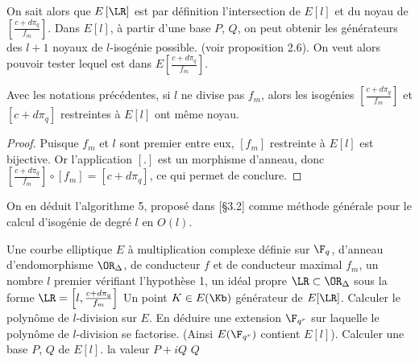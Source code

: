 On sait alors que $E\left[ \LR\right]$ est par définition l'intersection de $E\left[ l\right] $ et du noyau de $\left[  \frac{c + d\pi_{q}}{f_{m}}\right]$. Dans $E[l]$, à partir d'une base $P$, $Q$, on peut obtenir les générateurs des $l+1$ noyaux de $l$-isogénie possible. (voir proposition 2.6). On veut alors pouvoir tester lequel est dans $E\left[  \frac{c + d\pi_{q}}{f_{m}}\right]$. 

\begin{Prop}
	Avec les notations précédentes, si $l$ ne divise pas $f_{m}$, alors les isogénies $ \left[  \frac{c + d\pi_{q}}{f_{m}}\right]$ et $\left[ c + d\pi_{q}\right] $ restreintes à $E\left[ l\right] $ ont même noyau.
	
\end{Prop}

\begin{proof}
	Puisque $f_{m}$ et $l$ sont premier entre eux, $\left[ f_{m} \right]$ restreinte à $E\left[ l \right]$ est bijective. Or l'application $\left[.\right] $ est un morphisme d'anneau, donc $\left[  \frac{c + d\pi_{q}}{f_{m}}\right] \circ \left[ f_{m }\right] =  \left[ c + d\pi_{q}\right] $, ce qui permet de conclure.
\end{proof}

On en déduit l’algorithme 5, proposé dans \cite{BrokerCharlesLauter}[\S 3.2] comme méthode générale pour le calcul d'isogénie de degré $l$ en $O(l)$.

\begin{algorithm}
	\caption{Point générateur d'un groupe de $\LR$-torsion, méthode 1}
	\begin{algorithmic}[1]
		\Require Une courbe elliptique $E$ à multiplication complexe définie sur $\F_{q}$, d'anneau d'endomorphisme $\OR_{\Delta}$, de conducteur $f$ et de conducteur maximal $f_{m}$, un nombre $l$ premier vérifiant l'hypothèse 1, un idéal propre $\LR\subset\OR_{\Delta}$ sous la forme $\LR = \left[ l, \frac{c + d\pi_{q}}{f_{m}}\right]$
		\Ensure Un point $K\in E(\Kb)$ générateur de $E[\LR]$. 
		\State Calculer le polynôme de $l$-division sur $E$.
		\State En déduire une extension $\F_{q^r}$ sur laquelle le polynôme de $l$-division se factorise. (Ainsi $E(\F_{q^r})$ contient $E[l]$).
		\State Calculer une base $P$, $Q$ de $E\left[ l\right] $. 
		\Return la valeur $P + iQ$ 
		\EndIf
		\EndFor
		\State \Return $Q$
	\end{algorithmic}
\end{algorithm}

